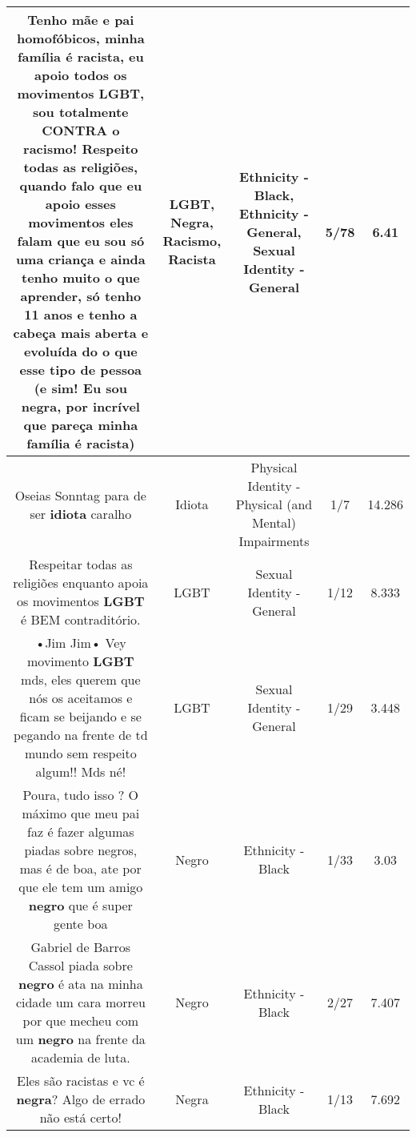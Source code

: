 \documentclass[11pt]{article}
\newlength\mylength
\begin{document}
\begin{center}
\begin{longtable}{|C{.65\mylength}|C{.30\mylength}|C{.12\mylength}|C{.12\mylength}|C{.12\mylength}|}
  \small Tenho mãe e pai homofóbicos,  minha família é \textbf{racista},  eu apoio todos os movimentos \textbf{LGBT}, sou totalmente CONTRA o \textbf{racismo}! Respeito todas as religiões,  quando falo que eu apoio esses movimentos eles falam que eu sou só uma criança e ainda tenho muito o que aprender,  só tenho 11 anos e tenho a cabeça mais aberta e evoluída do o que esse tipo de pessoa (e sim!  Eu sou \textbf{negra},  por incrível que pareça minha família é \textbf{racista})\normalsize   & LGBT, Negra, Racismo, Racista & Ethnicity - Black, Ethnicity - General, Sexual Identity - General & 5/78 & 6.41 \\  \hline
  \small Oseias Sonntag para de ser \textbf{idiota} caralho\normalsize   & Idiota & Physical Identity - Physical (and Mental) Impairments & 1/7 & 14.286 \\  \hline
  \small Respeitar todas as religiões enquanto apoia os movimentos \textbf{LGBT} é BEM contraditório.\normalsize   & LGBT & Sexual Identity - General & 1/12 & 8.333 \\  \hline
  \small •Jim Jim• Vey movimento \textbf{LGBT} mds, eles querem que nós os aceitamos e ficam se beijando e se pegando na frente de td mundo sem respeito algum!! Mds né!\normalsize   & LGBT & Sexual Identity - General & 1/29 & 3.448 \\  \hline
  \small Poura, tudo isso ? O máximo que meu pai faz é fazer algumas piadas sobre negros, mas é de boa, ate por que ele tem um amigo \textbf{negro} que é super gente boa\normalsize   & Negro & Ethnicity - Black & 1/33 & 3.03 \\  \hline
  \small Gabriel de Barros Cassol piada sobre \textbf{negro} é ata na minha cidade um cara morreu por que mecheu com um \textbf{negro} na frente da academia de luta.\normalsize   & Negro & Ethnicity - Black & 2/27 & 7.407 \\  \hline
  \small Eles são racistas e vc é \textbf{negra}? Algo de errado não está certo!\normalsize   & Negra & Ethnicity - Black & 1/13 & 7.692 \\  \hline

\end{longtable}
\end{center}
\end{document}
